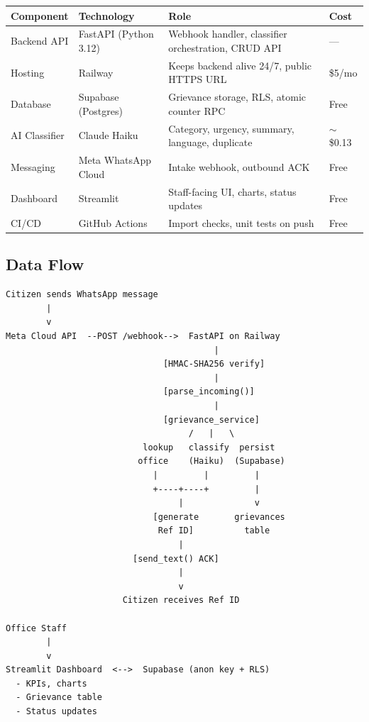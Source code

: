 \documentclass[11pt, a4paper]{article}
\begin{document}
\begin{tabularx}{\linewidth}{llXl}
\toprule
\textbf{Component} & \textbf{Technology} & \textbf{Role} & \textbf{Cost} \\
\midrule
Backend API     & FastAPI (Python 3.12) & Webhook handler, classifier orchestration, CRUD API & --- \\
Hosting         & Railway               & Keeps backend alive 24/7, public HTTPS URL & \$5/mo \\
Database        & Supabase (Postgres)   & Grievance storage, RLS, atomic counter RPC & Free \\
AI Classifier   & Claude Haiku          & Category, urgency, summary, language, duplicate & $\sim$\$0.13 \\
Messaging       & Meta WhatsApp Cloud   & Intake webhook, outbound ACK & Free \\
Dashboard       & Streamlit             & Staff-facing UI, charts, status updates & Free \\
CI/CD           & GitHub Actions        & Import checks, unit tests on push & Free \\
\bottomrule
\end{tabularx}

\subsection{Data Flow}

\begin{tcolorbox}[colback=lightgray, colframe=pollityblue, sharp corners, fontupper=\small\ttfamily]
\begin{verbatim}
Citizen sends WhatsApp message
        |
        v
Meta Cloud API  --POST /webhook-->  FastAPI on Railway
                                         |
                               [HMAC-SHA256 verify]
                                         |
                               [parse_incoming()]
                                         |
                               [grievance_service]
                                    /   |   \
                           lookup   classify  persist
                          office    (Haiku)  (Supabase)
                             |         |         |
                             +----+----+         |
                                  |              v
                             [generate       grievances
                              Ref ID]          table
                                  |
                         [send_text() ACK]
                                  |
                                  v
                       Citizen receives Ref ID

Office Staff
        |
        v
Streamlit Dashboard  <-->  Supabase (anon key + RLS)
  - KPIs, charts
  - Grievance table
  - Status updates
\end{verbatim}
\end{tcolorbox}
\end{document}
